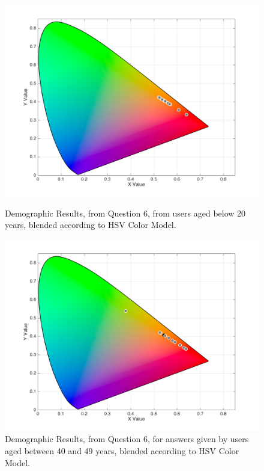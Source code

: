 \begin{figure}[!htbp]
  \centering
  \begin{minipage}{0.48\textwidth}
    \centering
    \includegraphics[width=\textwidth]{images/results/6_demo_age20_HSVresponses.png}
    \caption[Demographic Results, Question 6, Age below 20 years, according to HSV.]{Demographic Results, from Question 6, from users aged below 20 years, blended according to HSV Color Model.}
    \label{fig:age_1}
  \end{minipage}\hfill
  \begin{minipage}{0.48\textwidth}
    \centering
    \includegraphics[width=\textwidth]{images/results/6_demo_age40_49_HSVresponses.png}
    \caption[Demographic Results, Question 6, Age between 40-49 years, according to HSV.]{Demographic Results, from Question 6, for answers given by users aged between 40 and 49 years, blended according to HSV Color Model.}
    \label{fig:age_2}
  \end{minipage}
\end{figure}
%
